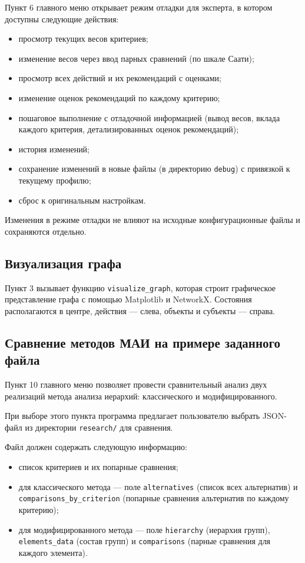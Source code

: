Пункт 6 главного меню открывает режим отладки для эксперта, в котором доступны следующие действия:

\begin{itemize}
\item просмотр текущих весов критериев;
\item изменение весов через ввод парных сравнений (по шкале Саати);
\item просмотр всех действий и их рекомендаций с оценками;
\item изменение оценок рекомендаций по каждому критерию;
\item пошаговое выполнение с отладочной информацией (вывод весов, вклада каждого критерия, детализированных оценок рекомендаций);
\item история изменений;
\item сохранение изменений в новые файлы (в директорию \texttt{debug}) с привязкой к текущему профилю;
\item сброс к оригинальным настройкам.
\end{itemize}

Изменения в режиме отладки не влияют на исходные конфигурационные файлы и сохраняются отдельно.

\subsection*{Визуализация графа}

Пункт 3 вызывает функцию \texttt{visualize\_graph}, которая строит графическое представление графа с помощью Matplotlib и NetworkX.
Состояния располагаются в центре, действия --- слева, объекты и субъекты --- справа.

\subsection*{Сравнение методов МАИ на примере заданного файла}

Пункт 10 главного меню позволяет провести сравнительный анализ двух реализаций метода анализа иерархий: классического и модифицированного.

При выборе этого пункта программа предлагает пользователю выбрать JSON-файл из директории \texttt{research/} для сравнения.

\clearpage
Файл должен содержать следующую информацию:
\begin{itemize}
\item список критериев и их попарные сравнения;
\item для классического метода --- поле \texttt{alternatives} (список всех альтернатив) и \texttt{comparisons\_by\_criterion} (попарные сравнения альтернатив по каждому критерию);
\item для модифицированного метода --- поле \texttt{hierarchy} (иерархия групп), \texttt{elements\_data} (состав групп) и \texttt{comparisons} (парные сравнения для каждого элемента).
\end{itemize}

